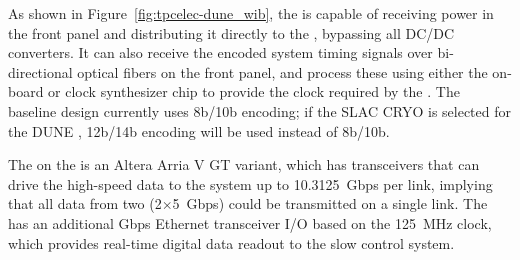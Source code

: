 As shown in Figure~\ref{fig:tpcelec-dune_wib}, the  is capable of receiving  power in the front panel and distributing it directly to the , bypassing all DC/DC converters.
It can also receive the encoded system timing signals over bi-directional optical
fibers on the front panel, and process these using either
the on-board  or clock synthesizer chip to provide the clock required by the .
The baseline  design currently uses 8b/10b encoding; if the SLAC CRYO  is selected for
the DUNE , 12b/14b encoding will be used instead of 8b/10b.



The  on the   is an Altera Arria V GT variant, which has
transceivers that can drive the high-speed data to the  system up to
10.3125~Gbps per link, implying that all data from
two  (2$\times$5~Gbps) could be transmitted on a single link.
The  has an additional Gbps Ethernet transceiver I/O based on the \SI{125}{MHz} clock, which 
provides real-time digital data readout to the slow control system.
